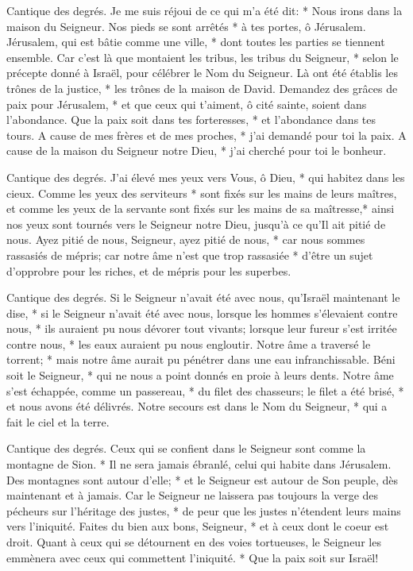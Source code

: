 Cantique des degrés. Je me suis réjoui de ce qui m'a été dit: * Nous irons dans la maison du Seigneur.
Nos pieds se sont arrêtés * à tes portes, ô Jérusalem.
Jérusalem, qui est bâtie comme une ville, * dont toutes les parties se tiennent ensemble.
Car c'est là que montaient les tribus, les tribus du Seigneur, * selon le précepte donné à Israël, pour célébrer le Nom du Seigneur.
Là ont été établis les trônes de la justice, * les trônes de la maison de David.
Demandez des grâces de paix pour Jérusalem, * et que ceux qui t'aiment, ô cité sainte, soient dans l'abondance.
Que la paix soit dans tes forteresses, * et l'abondance dans tes tours.
A cause de mes frères et de mes proches, * j'ai demandé pour toi la paix.
A cause de la maison du Seigneur notre Dieu, * j'ai cherché pour toi le bonheur.

Cantique des degrés. J'ai élevé mes yeux vers Vous, ô Dieu, * qui habitez dans les cieux.
Comme les yeux des serviteurs * sont fixés sur les mains de leurs maîtres, et comme les yeux de la servante sont fixés sur les mains de sa maîtresse,* ainsi nos yeux sont tournés vers le Seigneur notre Dieu, jusqu'à ce qu'Il ait pitié de nous.
Ayez pitié de nous, Seigneur, ayez pitié de nous, * car nous sommes rassasiés de mépris;
car notre âme n'est que trop rassasiée * d'être un sujet d'opprobre pour les riches, et de mépris pour les superbes.

Cantique des degrés. Si le Seigneur n'avait été avec nous, qu'Israël maintenant le dise, *
si le Seigneur n'avait été avec nous, lorsque les hommes s'élevaient contre nous, *
ils auraient pu nous dévorer tout vivants; lorsque leur fureur s'est irritée contre nous, *
les eaux auraient pu nous engloutir.
Notre âme a traversé le torrent; * mais notre âme aurait pu pénétrer dans une eau infranchissable.
Béni soit le Seigneur, * qui ne nous a point donnés en proie à leurs dents.
Notre âme s'est échappée, comme un passereau, * du filet des chasseurs; le filet a été brisé, * et nous avons été délivrés.
Notre secours est dans le Nom du Seigneur, * qui a fait le ciel et la terre.

Cantique des degrés. Ceux qui se confient dans le Seigneur sont comme la montagne de Sion. * Il ne sera jamais ébranlé, celui qui habite
dans Jérusalem. Des montagnes sont autour d'elle; * et le Seigneur est autour de Son peuple, dès maintenant et à jamais.
Car le Seigneur ne laissera pas toujours la verge des pécheurs sur l'héritage des justes, * de peur que les justes n'étendent leurs mains vers l'iniquité.
Faites du bien aux bons, Seigneur, * et à ceux dont le coeur est droit.
Quant à ceux qui se détournent en des voies tortueuses, le Seigneur les emmènera avec ceux qui commettent l'iniquité. * Que la paix soit sur Israël!

